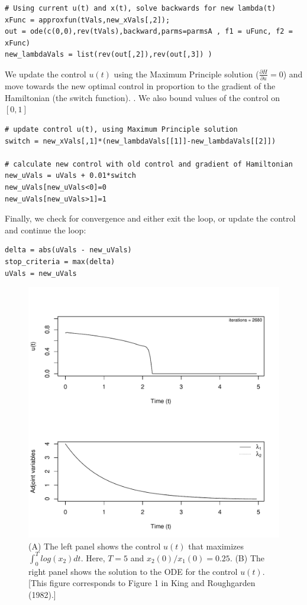 \documentclass[12pt, oneside]{article}   	%
\begin{document}
\begin{lstlisting}
# Using current u(t) and x(t), solve backwards for new lambda(t) 
xFunc = approxfun(tVals,new_xVals[,2]);	
out = ode(c(0,0),rev(tVals),backward,parms=parmsA , f1 = uFunc, f2 = xFunc)
new_lambdaVals = list(rev(out[,2]),rev(out[,3]) )
\end{lstlisting}

\noindent We update the control $u(t)$ using the Maximum Principle solution ($\frac{\partial H}{\partial u} = 0$) and move towards the new optimal control in proportion to the gradient of the Hamiltonian (the switch function).
. We also bound values of the control on $[0,1]$

\begin{lstlisting}
# update control u(t), using Maximum Principle solution 
switch = new_xVals[,1]*(new_lambdaVals[[1]]-new_lambdaVals[[2]])

# calculate new control with old control and gradient of Hamiltonian
new_uVals = uVals + 0.01*switch
new_uVals[new_uVals<0]=0
new_uVals[new_uVals>1]=1
\end{lstlisting}

\noindent Finally, we check for convergence and either exit the loop, or update the control and continue the loop:

\begin{lstlisting}
delta = abs(uVals - new_uVals)
stop_criteria = max(delta)
uVals = new_uVals
\end{lstlisting}

\begin{figure}[h]
   \centering
       \includegraphics[page=1,width=.9\textwidth]{../../figures/forwardBackwardSweep-x1=1-x2=025}  
    \caption{ (A) The left panel shows the control $u(t)$ that maximizes $\int_{0}^{T} log(x_2) dt.$ Here, $T=5$ and $x_2(0)/x_1(0) = 0.25$. (B) The right panel shows the solution to the ODE for the control $u(t)$. [This figure corresponds to Figure 1 in King and Roughgarden (1982).] }
 \label{fig:kingRoughgardenFigure1}
\end{figure}
\end{document}
